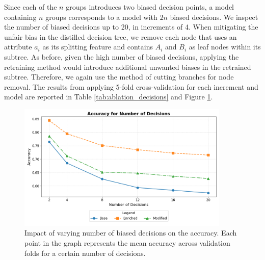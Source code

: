 Since each of the $n$ groups introduces two biased decision points, a model containing $n$ groups corresponds to a model with $2n$ biased decisions.
We inspect the number of biased decisions up to 20, in increments of 4. 
When mitigating the unfair bias in the distilled decision tree,
we remove each node that uses an attribute $a_i$ as its splitting feature and contains $A_i$ and $B_i$ as leaf nodes within its subtree.
As before, given the high number of biased decisions, applying the retraining method would introduce additional unwanted biases in the retrained subtree.
Therefore, we again use the method of cutting branches for node removal. 
The results from applying 5-fold cross-validation for each increment and model are reported in Table \ref{tab:ablation_decisions} and Figure \ref{fig:ablation_decisions_accuracy}. 

\begin{figure}[h!]
    \centering
    \includegraphics[width=0.9\textwidth]{gfx/ablation_decisions_accuracy.png}
    \caption{Impact of varying number of biased decisions on the accuracy.
    Each point in the graph represents the mean accuracy across validation folds for a certain number of decisions.}
    \label{fig:ablation_decisions_accuracy}
\end{figure}


